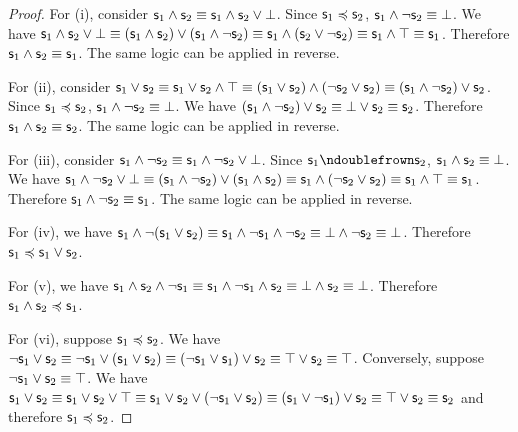 \documentclass[11pt,letterpaper,fleqn]{memoir} %
\begin{document}
\begin{mathSection}
\begin{proof}
	For (i), consider $\mathsf{s}_1 \wedge \mathsf{s}_2 \equiv \mathsf{s}_1 \wedge \mathsf{s}_2 \vee \bot$. Since $\mathsf{s}_1 \preccurlyeq \mathsf{s}_2$, $\mathsf{s}_1 \wedge \neg \mathsf{s}_2 \equiv \bot$. We have $\mathsf{s}_1 \wedge \mathsf{s}_2 \vee \bot \equiv ( \mathsf{s}_1 \wedge \mathsf{s}_2 ) \vee (\mathsf{s}_1 \wedge \neg \mathsf{s}_2) \equiv \mathsf{s}_1 \wedge (\mathsf{s}_2 \vee \neg \mathsf{s}_2) \equiv \mathsf{s}_1 \wedge \top \equiv \mathsf{s}_1$. Therefore $\mathsf{s}_1 \wedge \mathsf{s}_2 \equiv \mathsf{s}_1$. The same logic can be applied in reverse.
	
	For (ii), consider $\mathsf{s}_1 \vee \mathsf{s}_2 \equiv \mathsf{s}_1 \vee \mathsf{s}_2 \wedge \top \equiv (\mathsf{s}_1 \vee \mathsf{s}_2) \wedge (\neg \mathsf{s}_2 \vee \mathsf{s}_2) \equiv (\mathsf{s}_1 \wedge \neg \mathsf{s}_2) \vee \mathsf{s}_2$. Since $\mathsf{s}_1 \preccurlyeq \mathsf{s}_2$, $\mathsf{s}_1 \wedge \neg \mathsf{s}_2 \equiv \bot$. We have $(\mathsf{s}_1 \wedge \neg \mathsf{s}_2) \vee \mathsf{s}_2 \equiv \bot \vee \mathsf{s}_2 \equiv \mathsf{s}_2$. Therefore $\mathsf{s}_1 \wedge \mathsf{s}_2 \equiv \mathsf{s}_2$. The same logic can be applied in reverse.

	For (iii), consider $\mathsf{s}_1 \wedge \neg \mathsf{s}_2 \equiv \mathsf{s}_1 \wedge \neg \mathsf{s}_2 \vee \bot$. Since $\stmt_1 \ncomp \stmt_2$, $\mathsf{s}_1 \wedge \mathsf{s}_2 \equiv \bot$. We have $\mathsf{s}_1 \wedge \neg \mathsf{s}_2 \vee \bot \equiv ( \mathsf{s}_1 \wedge \neg \mathsf{s}_2 ) \vee (\mathsf{s}_1 \wedge \mathsf{s}_2) \equiv \mathsf{s}_1 \wedge (\neg \mathsf{s}_2 \vee \mathsf{s}_2) \equiv \mathsf{s}_1 \wedge \top \equiv \mathsf{s}_1$. Therefore $\mathsf{s}_1 \wedge \neg \mathsf{s}_2 \equiv \mathsf{s}_1$. The same logic can be applied in reverse.
	
	For (iv), we have $\mathsf{s}_1 \wedge \neg (\mathsf{s}_1 \vee \mathsf{s}_2) \equiv \mathsf{s}_1 \wedge \neg \mathsf{s}_1 \wedge \neg \mathsf{s}_2 \equiv \bot \wedge \neg \mathsf{s}_2 \equiv \bot$. Therefore $\mathsf{s}_1 \preccurlyeq \mathsf{s}_1 \vee \mathsf{s}_2$.
	
	For (v), we have $\mathsf{s}_1 \wedge \mathsf{s}_2 \wedge \neg \mathsf{s}_1 \equiv \mathsf{s}_1 \wedge \neg \mathsf{s}_1 \wedge \mathsf{s}_2 \equiv \bot \wedge \mathsf{s}_2 \equiv \bot$. Therefore $\mathsf{s}_1 \wedge \mathsf{s}_2 \preccurlyeq \mathsf{s}_1$.
	
	For (vi), suppose $\mathsf{s}_1 \preccurlyeq \mathsf{s}_2$. We have $\neg \mathsf{s}_1 \vee \mathsf{s}_2 \equiv \neg \mathsf{s}_1 \vee ( \mathsf{s}_1 \vee \mathsf{s}_2 ) \equiv (\neg \mathsf{s}_1 \vee \mathsf{s}_1) \vee \mathsf{s}_2 \equiv \top \vee \mathsf{s}_2 \equiv \top$. Conversely, suppose $\neg \mathsf{s}_1 \vee \mathsf{s}_2 \equiv \top$. We have $\mathsf{s}_1 \vee \mathsf{s}_2 \equiv \mathsf{s}_1 \vee \mathsf{s}_2 \vee \top \equiv \mathsf{s}_1 \vee \mathsf{s}_2 \vee (\neg \mathsf{s}_1 \vee \mathsf{s}_2) \equiv (\mathsf{s}_1 \vee \neg \mathsf{s}_1) \vee \mathsf{s}_2 \equiv \top \vee \mathsf{s}_2 \equiv \mathsf{s}_2$ and therefore $\mathsf{s}_1 \preccurlyeq \mathsf{s}_2$.
\end{proof}


\end{mathSection}
\end{document}
